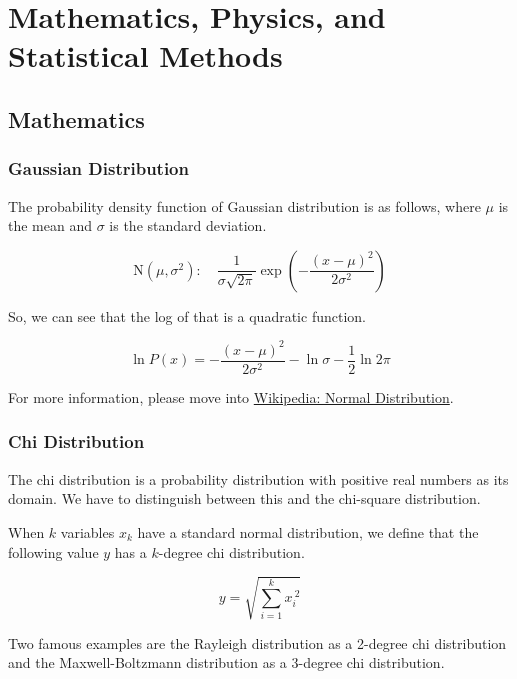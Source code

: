 \section{Mathematics, Physics, and Statistical Methods}

\subsection{Mathematics}

\subsubsection{Gaussian Distribution}

The probability density function of Gaussian distribution is as follows, where $\mu$ is the mean and $\sigma$ is the standard deviation.

\begin{equation}
    \mathrm{N}(\mu, \sigma^2): \quad \frac{1}{\sigma\sqrt{2\pi}} \exp{\left(-\frac{(x - \mu)^2}{2 \sigma^2} \right)}
\end{equation}

So, we can see that the log of that is a quadratic function.

\begin{equation}
    \ln{P(x)} = -\frac{(x - \mu)^2}{2 \sigma^2} - \ln{\sigma} - \frac{1}{2} \ln{2\pi}
\end{equation}

For more information, please move into \href{https://en.wikipedia.org/wiki/Normal_distribution}{Wikipedia: Normal Distribution}.

\subsubsection{Chi Distribution}

The chi distribution is a probability distribution with positive real numbers as its domain. We have to distinguish between this and the chi-square distribution.

When $k$ variables $x_k$ have a standard normal distribution, we define that the following value $y$ has a $k$-degree chi distribution.

\begin{equation}
    y = \sqrt{\sum_{i=1}^k x_i^{\ 2}}
\end{equation}

Two famous examples are the Rayleigh distribution as a 2-degree chi distribution and the Maxwell-Boltzmann distribution as a 3-degree chi distribution.

